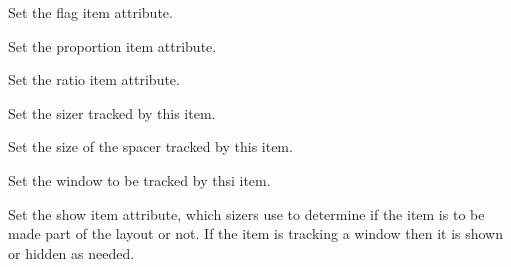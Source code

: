 Set the flag  item attribute.


\label{wxsizeritemsetinitsize}



\label{wxsizeritemsetproportion}


Set the proportion item attribute.

\label{wxsizeritemsetratio}




Set the ratio item attribute.


\label{wxsizeritemsetsizer}


Set the sizer tracked by this item.


\label{wxsizeritemsetspacer}


Set the size of the spacer tracked by this item.


\label{wxsizeritemsetwindow}


Set the window to be tracked by thsi item.


\label{wxsizeritemshow}


Set the show item attribute, which sizers use to determine if the item
is to be made part of the layout or not.  If the item is tracking a
window then it is shown or hidden as needed.

